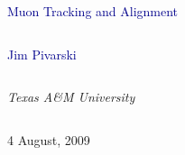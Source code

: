 \documentclass[compress]{beamer}
\begin{document}
\begin{frame}
\vfill
\begin{center}
\textcolor{darkblue}{\Large Muon Tracking and Alignment}

\vfill
\begin{columns}
\begin{center}
\large
\textcolor{darkblue}{Jim Pivarski}
\end{center}
\end{columns}

\begin{columns}
\begin{center}
\scriptsize
{\it Texas A\&M University}
\end{center}
\end{columns}

\vfill
 4 August, 2009

\end{center}
\end{frame}


\small
\end{document}
